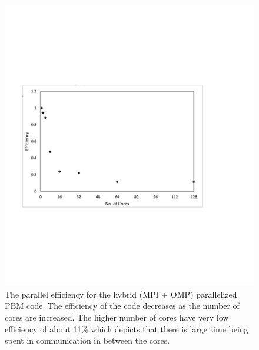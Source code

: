 \documentclass[preprint,11pt,authoryear]{elsarticle}
\begin{document}
\begin{figure}[H]
\centering
\includegraphics[scale=0.7]{rslts_PBM_Efficiency.pdf}
\caption{The parallel efficiency for the hybrid (MPI + OMP) parallelized PBM code. The efficiency of the 
    code decreases as the number of cores are increased. The higher number of cores have very low 
    efficiency of about 11\% which depicts that there is large time being spent in communication in 
    between the cores.}
\label{fig:rslts_PBM_parallel_efficiency}
\end{figure}
\end{document}

